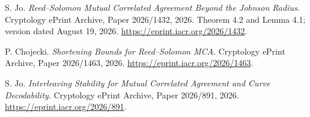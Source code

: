  S. Jo.
\emph{Reed--Solomon Mutual Correlated Agreement Beyond the Johnson Radius}.
Cryptology ePrint Archive, Paper 2026/1432, 2026.
Theorem 4.2 and Lemma 4.1; version dated August 19, 2026.
\url{https://eprint.iacr.org/2026/1432}.

 P. Chojecki.
\emph{Shortening Bounds for Reed--Solomon MCA}.
Cryptology ePrint Archive, Paper 2026/1463, 2026.
\url{https://eprint.iacr.org/2026/1463}.

 S. Jo.
\emph{Interleaving Stability for Mutual Correlated Agreement and Curve Decodability}.
Cryptology ePrint Archive, Paper 2026/891, 2026.
\url{https://eprint.iacr.org/2026/891}.
